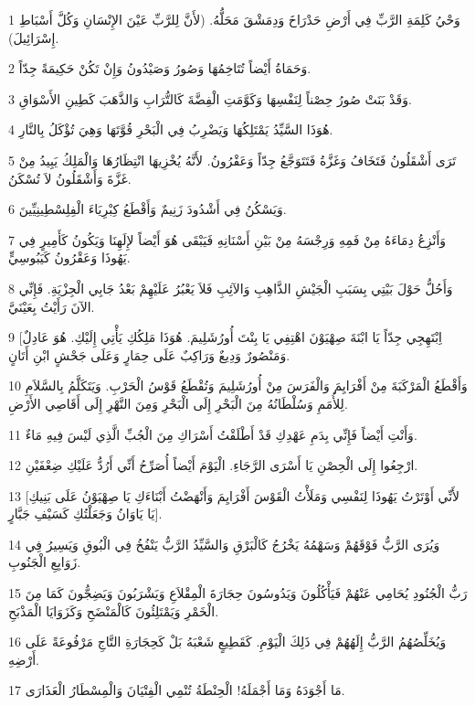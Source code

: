 \par 1 وَحْيُ كَلِمَةِ الرَّبِّ فِي أَرْضِ حَدْرَاخَ وَدِمَشْقَ مَحَلُّهُ. (لأَنَّ لِلرَّبِّ عَيْنَ الإِنْسَانِ وَكُلَّ أَسْبَاطِ إِسْرَائِيلَ).
\par 2 وَحَمَاةُ أَيْضاً تُتَاخِمُهَا وَصُورُ وَصَيْدُونُ وَإِنْ تَكُنْ حَكِيمَةً جِدّاً.
\par 3 وَقَدْ بَنَتْ صُورُ حِصْناً لِنَفْسِهَا وَكَوَّمَتِ الْفِضَّةَ كَالتُّرَابِ وَالذَّهَبَ كَطِينِ الأَسْوَاقِ.
\par 4 هُوَذَا السَّيِّدُ يَمْتَلِكُهَا وَيَضْرِبُ فِي الْبَحْرِ قُوَّتَهَا وَهِيَ تُؤْكَلُ بِالنَّارِ.
\par 5 تَرَى أَشْقَلُونُ فَتَخَافُ وَغَزَّةُ فَتَتَوَجَّعُ جِدّاً وَعَقْرُونُ. لأَنَّهُ يُخْزِيهَا انْتِظَارُهَا وَالْمَلِكُ يَبِيدُ مِنْ غَزَّةَ وَأَشْقَلُونُ لاَ تُسْكَنُ.
\par 6 وَيَسْكُنُ فِي أَشْدُودَ زَنِيمٌ وَأَقْطَعُ كِبْرِيَاءَ الْفِلِسْطِينِيِّينَ.
\par 7 وَأَنْزِعُ دِمَاءَهُ مِنْ فَمِهِ وَرِجْسَهُ مِنْ بَيْنِ أَسْنَانِهِ فَيَبْقَى هُوَ أَيْضاً لإِلَهِنَا وَيَكُونُ كَأَمِيرٍ فِي يَهُوذَا وَعَقْرُونُ كَيَبُوسِيٍّ.
\par 8 وَأَحُلُّ حَوْلَ بَيْتِي بِسَبَبِ الْجَيْشِ الذَّاهِبِ وَالآئِبِ فَلاَ يَعْبُرُ عَلَيْهِمْ بَعْدُ جَابِي الْجِزْيَةِ. فَإِنِّي الآنَ رَأَيْتُ بِعَيْنَيَّ.
\par 9 [اِبْتَهِجِي جِدّاً يَا ابْنَةَ صِهْيَوْنَ اهْتِفِي يَا بِنْتَ أُورُشَلِيمَ. هُوَذَا مَلِكُكِ يَأْتِي إِلَيْكِ. هُوَ عَادِلٌ وَمَنْصُورٌ وَدِيعٌ وَرَاكِبٌ عَلَى حِمَارٍ وَعَلَى جَحْشٍ ابْنِ أَتَانٍ.
\par 10 وَأَقْطَعُ الْمَرْكَبَةَ مِنْ أَفْرَايِمَ وَالْفَرَسَ مِنْ أُورُشَلِيمَ وَتُقْطَعُ قَوْسُ الْحَرْبِ. وَيَتَكَلَّمُ بِالسَّلاَمِ لِلأُمَمِ وَسُلْطَانُهُ مِنَ الْبَحْرِ إِلَى الْبَحْرِ وَمِنَ النَّهْرِ إِلَى أَقَاصِي الأَرْضِ.
\par 11 وَأَنْتِ أَيْضاً فَإِنِّي بِدَمِ عَهْدِكِ قَدْ أَطْلَقْتُ أَسْرَاكِ مِنَ الْجُبِّ الَّذِي لَيْسَ فِيهِ مَاءٌ.
\par 12 ارْجِعُوا إِلَى الْحِصْنِ يَا أَسْرَى الرَّجَاءِ. الْيَوْمَ أَيْضاً أُصَرِّحُ أَنِّي أَرُدُّ عَلَيْكِ ضِعْفَيْنِ.
\par 13 [لأَنِّي أَوْتَرْتُ يَهُوذَا لِنَفْسِي وَمَلَأْتُ الْقَوْسَ أَفْرَايِمَ وَأَنْهَضْتُ أَبْنَاءَكِ يَا صِهْيَوْنُ عَلَى بَنِيكِ يَا يَاوَانُ وَجَعَلْتُكِ كَسَيْفِ جَبَّارٍ].
\par 14 وَيُرَى الرَّبُّ فَوْقَهُمْ وَسَهْمُهُ يَخْرُجُ كَالْبَرْقِ وَالسَّيِّدُ الرَّبُّ يَنْفُخُ فِي الْبُوقِ وَيَسِيرُ فِي زَوَابِعِ الْجَنُوبِ.
\par 15 رَبُّ الْجُنُودِ يُحَامِي عَنْهُمْ فَيَأْكُلُونَ وَيَدُوسُونَ حِجَارَةَ الْمِقْلاَعِ وَيَشْرَبُونَ وَيَضِجُّونَ كَمَا مِنَ الْخَمْرِ وَيَمْتَلِئُونَ كَالْمَنْضَحِ وَكَزَوَايَا الْمَذْبَحِ.
\par 16 وَيُخَلِّصُهُمُ الرَّبُّ إِلَهُهُمْ فِي ذَلِكَ الْيَوْمِ. كَقَطِيعٍ شَعْبَهُ بَلْ كَحِجَارَةِ التَّاجِ مَرْفُوعَةً عَلَى أَرْضِهِ.
\par 17 مَا أَجْوَدَهُ وَمَا أَجْمَلَهُ! الْحِنْطَةُ تُنْمِي الْفِتْيَانَ وَالْمِسْطَارُ الْعَذَارَى.

